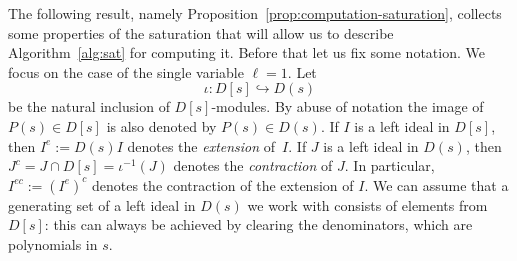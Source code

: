 \documentclass[a4paper,12pt]{amsart}
\theoremstyle{plain}
\theoremstyle{definition}
\theoremstyle{remark}
\def\CC{\mathbb{C}}
\DeclareMathOperator{\Sat}{Sat}
\begin{document}
%
%
%

The following result, namely Proposition~\ref{prop:computation-saturation}, collects some properties of the saturation
that will allow us to describe Algorithm~\ref{alg:sat} for computing it. Before that let us fix some notation.
We focus on the case of the single variable ${\ell}=1$. Let \[ \iota: D[s] \hookrightarrow D(s) \]
be the natural inclusion of $D[s]$-modules.
By abuse of notation the image of $P(s) \in D[s]$ is also denoted by $P(s) \in D(s)$.
If $I$ is a left ideal in $D[s]$, then $I^e := D(s) I$
denotes the \emph{extension} of~$I$. If $J$ is a left ideal in $D(s)$, then $J^c = J \cap D[s] = \iota^{-1}(J)$ denotes the \emph{contraction} of $J$.
In particular, $I^{ec}:=(I^{e})^c$ denotes the contraction of the extension of $I$. We can assume that a generating set of a left ideal in $D(s)$ we work with consists of elements from $D[s]$: this can always be achieved by clearing the denominators, which are polynomials in $s$.
\end{document}
